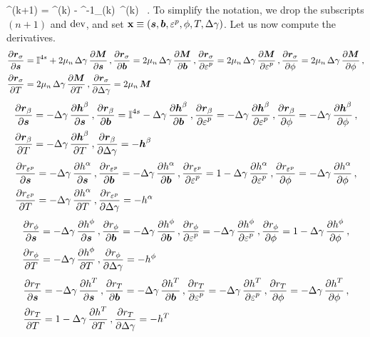 \Beq
  \Bx^{(k+1)} = \Bx^{(k)} - \left[\Partial{\Br}{\Bx}\right]^{-1}_{(k)}~\Br^{(k)} ~.
\Eeq
To simplify the notation, we drop the subscripts $(n+1)$ and $\Tdev$, and 
set $\Bx \equiv (\BsT, \BbT, \Ve^p, \phi, T, \Delta\gamma)$. Let us 
now compute the derivatives.
\[
  \Bal
  \Partial{\Br_\sigma}{\BsT} &= \SfI^{4s} + 2\mu_n\,\Delta\gamma\,\Partial{\BM}{\BsT} \,,
  \Partial{\Br_\sigma}{\BbT} = 2\mu_n\,\Delta\gamma\,\Partial{\BM}{\BbT} \,,
  \Partial{\Br_\sigma}{\Ve^p} = 2\mu_n\,\Delta\gamma\,\Partial{\BM}{\Ve^p} \,,
  \Partial{\Br_\sigma}{\phi} = 2\mu_n\,\Delta\gamma\,\Partial{\BM}{\phi} \,, \\
  \Partial{\Br_\sigma}{T} &= 2\mu_n\,\Delta\gamma\,\Partial{\BM}{T} \,,
  \Partial{\Br_\sigma}{\Delta\gamma} = 2\mu_n\,\BM
  \Eal
\]
\[
  \Bal
  \Partial{\Br_\beta}{\BsT} &=  -\Delta\gamma\,\Partial{\Bh^\beta}{\BsT} \,,
  \Partial{\Br_\beta}{\BbT} = \SfI^{4s} - \Delta\gamma\,\Partial{\Bh^\beta}{\BbT} \,,
  \Partial{\Br_\beta}{\Ve^p} = -\Delta\gamma\,\Partial{\Bh^\beta}{\Ve^p} \,,
  \Partial{\Br_\beta}{\phi} = -\Delta\gamma\,\Partial{\Bh^\beta}{\phi} \,, \\
  \Partial{\Br_\beta}{T} &= -\Delta\gamma\,\Partial{\Bh^\beta}{T} \,,
  \Partial{\Br_\beta}{\Delta\gamma} = -\Bh^\beta
  \Eal
\]
\[
  \Bal
  \Partial{r_{\Ve^p}}{\BsT} &=  -\Delta\gamma\,\Partial{h^\alpha}{\BsT} \,,
  \Partial{r_{\Ve^p}}{\BbT} = -\Delta\gamma\,\Partial{h^\alpha}{\BbT} \,,
  \Partial{r_{\Ve^p}}{\Ve^p} = 1 -\Delta\gamma\,\Partial{h^\alpha}{\Ve^p} \,,
  \Partial{r_{\Ve^p}}{\phi} = -\Delta\gamma\,\Partial{h^\alpha}{\phi} \,, \\
  \Partial{r_{\Ve^p}}{T} &= -\Delta\gamma\,\Partial{h^\alpha}{T} \,,
  \Partial{r_{\Ve^p}}{\Delta\gamma} = -h^\alpha
  \Eal
\]
\[
  \Bal
  \Partial{r_{\phi}}{\BsT} &=  -\Delta\gamma\,\Partial{h^\phi}{\BsT} \,,
  \Partial{r_{\phi}}{\BbT} = -\Delta\gamma\,\Partial{h^\phi}{\BbT} \,,
  \Partial{r_{\phi}}{\Ve^p} = -\Delta\gamma\,\Partial{h^\phi}{\Ve^p} \,,
  \Partial{r_{\phi}}{\phi} = 1 -\Delta\gamma\,\Partial{h^\phi}{\phi} \,, \\
  \Partial{r_{\phi}}{T} &= -\Delta\gamma\,\Partial{h^\phi}{T} \,,
  \Partial{r_{\phi}}{\Delta\gamma} = -h^\phi
  \Eal
\]
\[
  \Bal
  \Partial{r_{T}}{\BsT} &=  -\Delta\gamma\,\Partial{h^T}{\BsT} \,,
  \Partial{r_{T}}{\BbT} = -\Delta\gamma\,\Partial{h^T}{\BbT} \,,
  \Partial{r_{T}}{\Ve^p} = -\Delta\gamma\,\Partial{h^T}{\Ve^p} \,,
  \Partial{r_{T}}{\phi} = -\Delta\gamma\,\Partial{h^T}{\phi} \,, \\
  \Partial{r_{T}}{T} &= 1 -\Delta\gamma\,\Partial{h^T}{T} \,,
  \Partial{r_{T}}{\Delta\gamma} = -h^T
  \Eal
\]

